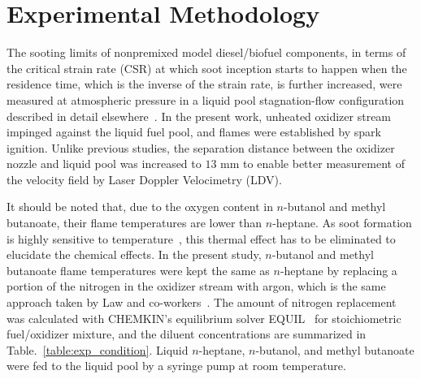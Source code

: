 \documentclass[review,3p,times]{elsarticleUS}
\begin{document}
\section{Experimental Methodology}

The sooting limits of nonpremixed model diesel/biofuel components, in terms of the critical strain rate (CSR) at which soot inception starts to happen when the residence time, which is the inverse of the strain rate, is further increased, were measured at atmospheric pressure in a liquid pool stagnation-flow configuration described in detail elsewhere~\cite{liu10}. In the present work, unheated oxidizer stream impinged against the liquid fuel pool, and flames were established by spark ignition. Unlike previous studies, the separation distance between the oxidizer nozzle and liquid pool was increased to $13$ mm to enable better measurement of the velocity field by Laser Doppler Velocimetry (LDV).

It should be noted that, due to the oxygen content in $n$-butanol and methyl butanoate, their flame temperatures are lower than $n$-heptane. As soot formation is highly sensitive to temperature~\cite{wang11}, this thermal effect has to be eliminated to elucidate the chemical effects. In the present study, $n$-butanol and methyl butanoate flame temperatures were kept the same as $n$-heptane by replacing a portion of the nitrogen in the oxidizer stream with argon, which is the same approach taken by Law and co-workers~\cite{du89,du91,axelbaum91}. The amount of nitrogen replacement was calculated with CHEMKIN's equilibrium solver EQUIL~\cite{chemkin} for stoichiometric fuel/oxidizer mixture, and the diluent concentrations are summarized in Table.~\ref{table:exp_condition}. Liquid $n$-heptane, $n$-butanol, and methyl butanoate were fed to the liquid pool by a syringe pump at room temperature.
\end{document}
